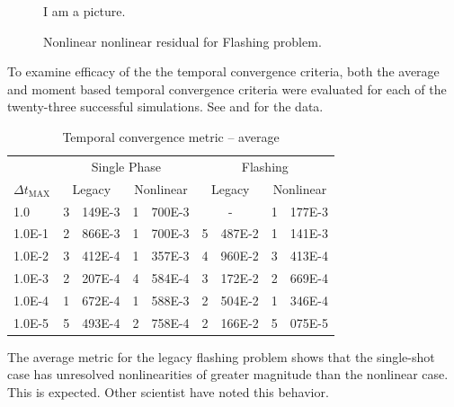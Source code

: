 \begin{figure}[h!t]
\begin{center}
I am a picture.
\end{center}
\caption{Nonlinear \cobra{} nonlinear residual for Flashing problem.}
\label{fig:nonlinear_flashing_residual}
\end{figure}

To examine efficacy of the the temporal convergence criteria, both the average and moment based temporal convergence criteria were evaluated for each of the twenty-three successful simulations.
See  and  for the data.

\begin{table}[h!t]
\centering
\begin{tabular}{@{}l r@{.}l r@{.}l r@{.}l r@{.}l @{}}
\toprule
& \multicolumn{4}{c}{Single Phase} & \multicolumn{4}{c}{Flashing}  \\
$\Delta t_{\text{MAX}}$ & \multicolumn{2}{c}{Legacy} & \multicolumn{2}{c}{Nonlinear} & \multicolumn{2}{c}{Legacy}& \multicolumn{2}{c}{Nonlinear}  \\
\midrule
1.0    & 3&149E-3 & 1&700E-3 & \multicolumn{2}{c}{-} & 1&177E-3 \\
1.0E-1 & 2&866E-3 & 1&700E-3 & 5&487E-2 & 1&141E-3 \\
1.0E-2 & 3&412E-4 & 1&357E-3 & 4&960E-2 & 3&413E-4 \\
1.0E-3 & 2&207E-4 & 4&584E-4 & 3&172E-2 & 2&669E-4 \\
1.0E-4 & 1&672E-4 & 1&588E-3 & 2&504E-2 & 1&346E-4 \\
1.0E-5 & 5&493E-4 & 2&758E-4 & 2&166E-2 & 5&075E-5 \\
\bottomrule  
\end{tabular}
\caption{Temporal convergence metric -- average}
\label{tab:criteria_ave}
\end{table}

The average metric for the legacy flashing problem shows that the single-shot case has unresolved nonlinearities of greater magnitude than the nonlinear case.
This is expected.
Other scientist have noted this behavior.


